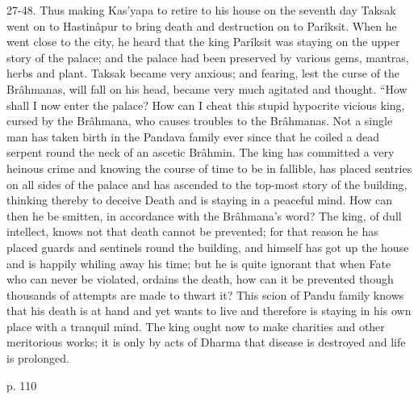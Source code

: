 27-48. Thus making Kas'yapa to retire to his house on the seventh day Taksak went on to Hastinâpur to bring death and destruction on to Parîksit. When he went close to the city, he heard that the king Parîksit was staying on the upper story of the palace; and the palace had been preserved by various gems, mantras, herbs and plant. Taksak became very anxious; and fearing, lest the curse of the Brâhmanas, will fall on his head, became very much agitated and thought. “How shall I now enter the palace? How can I cheat this stupid hypocrite vicious king, cursed by the Brâhmana, who causes troubles to the Brâhmanas. Not a single man has taken birth in the Pandava family ever since that he coiled a dead serpent round the neck of an ascetic Brâhmin. The king has committed a very heinous crime and knowing the course of time to be in fallible, has placed sentries on all sides of the palace and has ascended to the top-most story of the building, thinking thereby to deceive Death and is staying in a peaceful mind. How can then he be smitten, in accordance with the Brâhmana's word? The king, of dull intellect, knows not that death cannot be prevented; for that reason he has placed guards and sentinels round the building, and himself has got up the house and is happily whiling away his time; but he is quite ignorant that when Fate who can never be violated, ordains the death, how can it be prevented though thousands of attempts are made to thwart it? This scion  of Pandu family knows that his death is at hand and yet wants to live and therefore is staying in his own place with a tranquil mind. The king ought now to make charities and other meritorious works; it is only by acts of Dharma that disease is destroyed and life is prolonged.

 

p. 110

 

